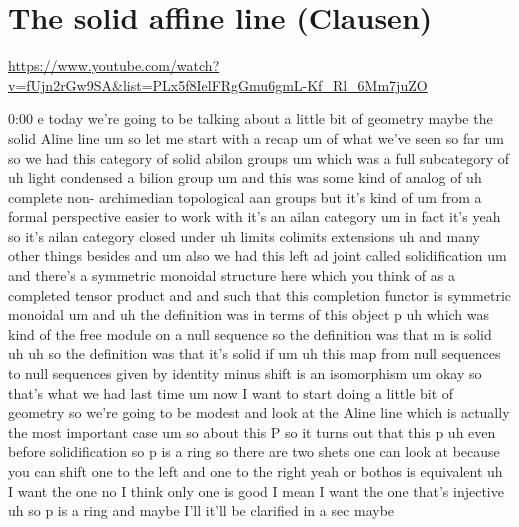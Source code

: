 
\section{\ufs The solid affine line (Clausen)}

\url{https://www.youtube.com/watch?v=fUjn2rGw9SA&list=PLx5f8IelFRgGmu6gmL-Kf_Rl_6Mm7juZO}
\renewcommand{\yt}[2]{\href{https://www.youtube.com/watch?v=fUjn2rGw9SA&list=PLx5f8IelFRgGmu6gmL-Kf_Rl_6Mm7juZO&t=#1}{#2}}
\vspace{1em}

\begin{unfinished}{0:00}
e
today  we're  going  to  be  talking  about  a
little  bit  of  geometry  maybe  the  solid
Aline  line  um  so  let  me  start  with  a
recap
um  of  what  we've  seen  so  far  um  so  we
had  this  category  of  solid  abilon
groups  um  which  was  a  full  subcategory
of  uh  light  condensed  a  bilion
group  um  and  this  was  some  kind  of
analog  of  uh  complete
non-  archimedian
topological  aan
groups  but  it's  kind  of  um  from  a  formal
perspective  easier  to  work  with  it's  an
ailan
category  um  in  fact  it's  yeah  so  it's
ailan  category  closed
under  uh  limits
colimits
extensions
uh  and  many  other  things  besides  and  um
also  we  had  this  left  ad  joint  called
solidification  um  and  there's  a
symmetric  monoidal  structure  here  which
you  think  of  as  a  completed  tensor
product  and  and  such  that  this
completion  functor  is  symmetric
monoidal
um  and  uh  the  definition  was  in  terms  of
this  object  p  uh  which  was  kind  of  the
free  module  on  a  null
sequence  so  the  definition  was  that  m  is
solid
uh
uh  so  the  definition  was  that  it's  solid
if
um  uh  this  map  from  null  sequences  to
null  sequences  given  by  identity  minus
shift  is  an
isomorphism  um
okay  so  that's  what  we  had  last  time  um
now  I  want  to  start  doing  a  little  bit
of  geometry  so  we're  going  to  be  modest
and  look  at  the  Aline  line  which  is
actually  the  most  important  case  um  so
about  this  P  so  it  turns  out  that  this  p
uh  even  before  solidification  so  p  is  a
ring  so  there  are  two  shets  one  can  look
at  because  you  can  shift  one  to  the  left
and  one  to  the  right  yeah  or  bothos  is
equivalent
uh  I  want  the  one  no  I  think  only  one  is
good  I  mean  I  want  the  one  that's
injective  uh  so  p  is  a  ring  and  maybe
I'll  it'll  be  clarified  in  a  sec  maybe

\end{unfinished}
